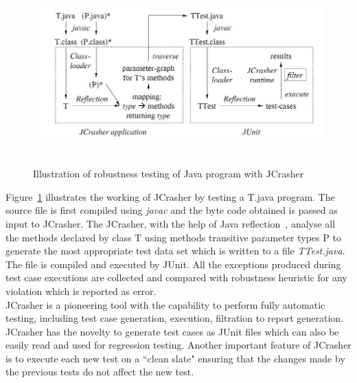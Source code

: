 \begin{figure}[h]
	\centering
	\includegraphics[width=15cm, height=7cm]{chapter2/JCrasher.png}
	\caption{Illustration of robustness testing of Java program with JCrasher~\cite{Pacheco2007b}}
	\label{fig:JCrasher}
\end{figure}

Figure~\ref{fig:JCrasher} illustrates the working of JCrasher by testing a T.java program. The source file is first compiled using {\it javac} and the byte code obtained is passed as input to JCrasher. The JCrasher, with the help of Java reflection~\cite{chan1999java}, analyse all the methods declared by class T using methods transitive parameter types P to generate the most appropriate test data set which is written to a file {\it TTest.java}. The file is compiled and executed by JUnit. All the exceptions produced during test case executions are collected and compared with robustness heuristic for any violation which is reported as error.\\

\noindent JCrasher is a pioneering tool with the capability to perform fully automatic testing, including test case generation, execution, filtration to report generation. JCrasher has the novelty to generate test cases as JUnit files which can also be easily read and used for regression testing. Another important feature of JCrasher is to execute each new test on a ``clean slate" ensuring that the changes made by the previous tests do not affect the new test.  



